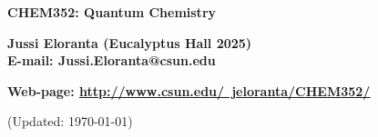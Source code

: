 \documentclass[serif]{beamer}
\begin{document}
\phantom{hauki}
\vfill
\begin{center}
\textbf{CHEM352: Quantum Chemistry}\\

\vspace{1cm}

\textbf{Jussi Eloranta (Eucalyptus Hall 2025)}\\
\textbf{E-mail: Jussi.Eloranta@csun.edu}\\

\vspace{1cm}

\textbf{Web-page: \href{http://www.csun.edu/~jeloranta/CHEM352/}{\underline{http://www.csun.edu/~jeloranta/CHEM352/}}}\\

\vspace{1cm}

{\tiny (Updated: \today)}

\end{center}
\vfill
\newpage








% 

%

%
\end{document}
